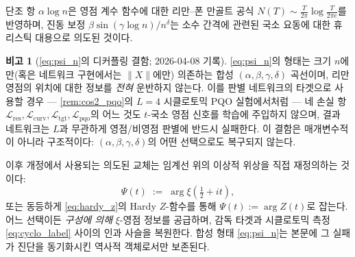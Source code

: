 \documentclass[11pt, a4paper]{article}
\theoremstyle{definition}
\newtheorem{remark}{비고}[section]
\theoremstyle{plain}
\newcommand{\xif}{\xi}
\newcommand{\Psip}{\Psi}
\begin{document}
단조 항 $\alpha\log n$은 영점 계수 함수에 대한 리만--폰 만골트 공식 $N(T) \sim \frac{T}{2\pi}\log\frac{T}{2\pi e}$를 반영하며, 진동 보정 $\beta\sin(\gamma\log n)/n^\delta$는 소수 간격에 관련된 국소 요동에 대한 휴리스틱 대용으로 의도된 것이다.

\begin{remark}[\cref{eq:psi_n}의 디커플링 결함; 2026-04-08 기록]
\label{rem:psi_defect}
\cref{eq:psi_n}의 형태는 크기 $n$에만(혹은 네트워크 구현에서는 $\|X\|$에만) 의존하는 합성 $(\alpha,\beta,\gamma,\delta)$ 곡선이며, 리만 영점의 위치에 대한 정보를 \emph{전혀} 운반하지 않는다. 이를 판별 네트워크의 타겟으로 사용할 경우 — \cref{rem:cos2_pqo}의 $L=4$ 시클로토믹 PQO 실험에서처럼 — 네 손실 항 $\mathcal{L}_{\mathrm{res}},\mathcal{L}_{\mathrm{curv}},\mathcal{L}_{\mathrm{tgt}},\mathcal{L}_{\mathrm{pqo}}$의 어느 것도 $t$-국소 영점 신호를 학습에 주입하지 않으며, 결과 네트워크는 $L$과 무관하게 영점/비영점 판별에 반드시 실패한다. 이 결함은 매개변수적이 아니라 구조적이다: $(\alpha,\beta,\gamma,\delta)$의 어떤 선택으로도 복구되지 않는다.

\smallskip
이후 개정에서 사용되는 의도된 교체는 임계선 위의 이상적 위상을 직접 재정의하는 것이다:
\begin{equation}
  \Psip(t) \;:=\; \arg \xif(\tfrac{1}{2}+it),
  \label{eq:psi_supervised}
\end{equation}
또는 동등하게 \cref{eq:hardy_z}의 Hardy $Z$-함수를 통해 $\Psip(t) := \arg Z(t)$로 잡는다. 어느 선택이든 \emph{구성에 의해} $\xif$-영점 정보를 공급하며, 감독 타겟과 시클로토믹 측정 \cref{eq:cyclo_label} 사이의 인과 사슬을 복원한다. 합성 형태 \cref{eq:psi_n}는 본문에 그 실패가 진단을 동기화시킨 역사적 객체로서만 보존된다.


\end{remark}
\end{document}
